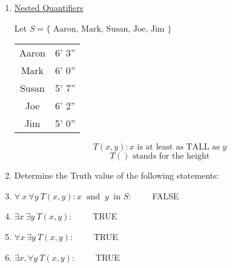\documentclass[10pt,letterpaper]{article}
\newcommand{\xmark}{\ding{55}}%
\begin{document}
{    
    
    
\newpage{}
\begin{enumerate}
    \item[]
    \begin{center}
                \underline{Nested Quantifiers} \vspace{.5em}
    \end{center}
    Let $S = \{ \text{ Aaron, Mark, Susan, Joe, Jim } \}$

    \vspace{.4em}
    \begin{table}[h!]
    \centering
        \begin{tabular}{c|c}
            Aaron   &  6' 3'' \\
            Mark    &  6' 0'' \\
            Susan   &  5' 7'' \\
            Joe     &  6' 2'' \\
            Jim     &  5' 0'' \\
        \end{tabular}
    \end{table}
    $$ T(x,y) : x \text{ is at least as TALL as } y $$
    $$T() \text{ stands for the height}$$
    \vspace{.5em}
    \item[] Determine the Truth value of the following statements:
    \item $\forall \ x  \ \forall y \ T(x,y) : x \ \text{ and } \ y \ \text{ in } S : \qquad$ FALSE \xmark
    \item $\exists x \ \exists y \ T(x,y) :  \qquad$ TRUE \checkmark
    \item $\forall x \ \exists y \ T(x,y) : \qquad $ TRUE \checkmark
    \item $\exists x , \forall y  \ T(x,y) : \qquad$ TRUE \checkmark 
    
\end{enumerate}

}
\end{document}
